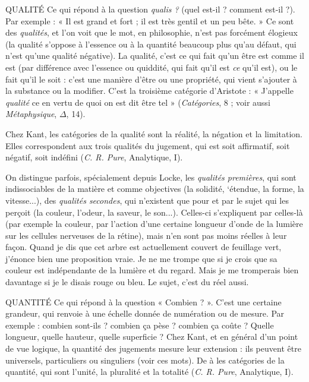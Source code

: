 QUALITÉ Ce qui répond à la question {\it qualis ?} (quel est-il ? comment est-il ?).
Par exemple : « Il est grand et fort ; il est très gentil et un peu
bête. » Ce sont des {\it qualités}, et l’on voit que le mot, en philosophie, n’est
pas forcément élogieux (la qualité s’oppose à l’essence ou à la quantité
beaucoup plus qu’au défaut, qui n’est qu’une qualité négative). La qualité,
c’est ce qui fait qu’un être est comme il est (par différence avec l’essence ou
quiddité, qui fait qu’il est {\it ce} qu’il est), ou le fait qu’il le soit : c’est une
manière d’être ou une propriété, qui vient s'ajouter à la substance ou la
modifier. C’est la troisième catégorie d’Aristote : « J’appelle {\it qualité} ce en
vertu de quoi on est dit être tel » ({\it Catégories}, 8 ; voir aussi {\it Métaphysique}, $\Delta$,
14).

Chez Kant, les catégories de la qualité sont la réalité, la négation et la
limitation. Elles correspondent aux trois qualités du jugement, qui est soit
affirmatif, soit négatif, soit indéfini ({\it C. R. Pure}, Analytique, I).

On distingue parfois, spécialement depuis Locke, les {\it qualités premières},
qui sont indissociables de la matière et comme objectives (la solidité,
‘étendue, la forme, la vitesse...), des {\it qualités secondes}, qui n'existent que
pour et par le sujet qui les perçoit (la couleur, l'odeur, la saveur, le son...).
Celles-ci s’expliquent par celles-là (par exemple la couleur, par l’action
d’une certaine longueur d’onde de la lumière sur les cellules nerveuses de la
rétine), mais n’en sont pas moins réelles à leur façon. Quand je dis que cet
arbre est actuellement couvert de feuillage vert, j’énonce bien une proposition
vraie. Je ne me trompe que si je crois que sa couleur est indépendante
de la lumière et du regard. Mais je me tromperais bien davantage si je le
disais rouge ou bleu. Le sujet, c’est du réel aussi.

QUANTITÉ Ce qui répond à la question « Combien ? ». C’est une certaine
grandeur, qui renvoie à une échelle donnée de numération ou
de mesure. Par exemple : combien sont-ils ? combien ça pèse ? combien ça
coûte ? Quelle longueur, quelle hauteur, quelle superficie ? Chez Kant, et en
général d’un point de vue logique, la quantité des jugements mesure leur
extension : ils peuvent être universels, particuliers ou singuliers (voir ces mots).
De à les catégories de la quantité, qui sont l'unité, la pluralité et la totalité
({\it C. R. Pure}, Analytique, I).

